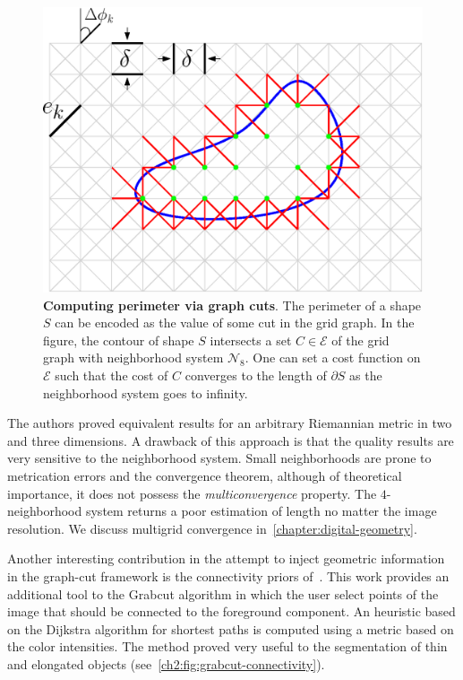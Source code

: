 \begin{figure}
\center
\includegraphics[scale=0.5]{figures/chapter3/perimeter-graph-cuts/geodesics.eps}
\caption{\textbf{Computing perimeter via graph cuts}. The perimeter of a shape $S$ can be encoded as the value of some cut in the grid graph. In the figure, the contour of shape $S$ intersects a set $C \in \mathcal{E}$ of the grid graph with neighborhood system $\mathcal{N}_8$. One can set a cost function on $\mathcal{E}$ such that the cost of $C$ converges to the length of $\partial S$ as the neighborhood system goes to infinity.}
\label{ch2:fig:geodesic-grid-graph-shape-intersection}
\end{figure}

The authors proved equivalent results for an arbitrary Riemannian metric in two and three dimensions. A drawback of this approach is that the quality results are very sensitive to the neighborhood system. Small neighborhoods are prone to metrication errors and the convergence theorem, although of theoretical importance, it does not possess the \emph{multiconvergence} property. The $4$-neighborhood system returns a poor estimation of length no matter the image resolution. We discuss multigrid convergence in~\cref{chapter:digital-geometry}.

Another interesting contribution in the attempt to inject geometric information in the graph-cut framework is the connectivity priors of~\cite{vicente08graph}. This work provides an additional tool to the Grabcut algorithm in which the user select points of the image that should be connected to the foreground component. An heuristic based on the Dijkstra algorithm for shortest paths is computed using a metric based on the color intensities. The method proved very useful to the segmentation of thin and elongated objects (see~\cref{ch2:fig:grabcut-connectivity}).

